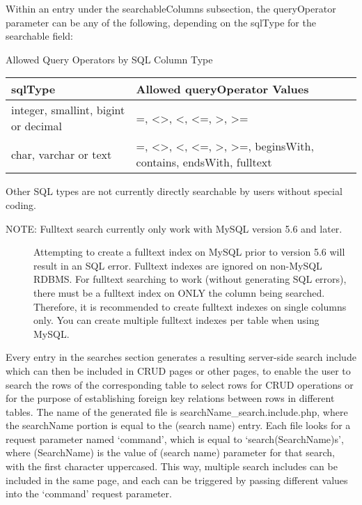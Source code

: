 \documentclass[letterpaper,10pt,english]{sphinxmanual}
\begin{document}
Within an entry under the searchableColumns subsection, the queryOperator parameter can be any of
the following, depending on the sqlType for the searchable field:

Allowed Query Operators by SQL Column Type

\begin{tabulary}{\linewidth}{|L|L|}
\hline
\textsf{\relax 
sqlType
} & \textsf{\relax 
Allowed queryOperator Values
}\\
\hline
integer, smallint, bigint or decimal
 & 
=, \textless{}\textgreater{}, \textless{}, \textless{}=, \textgreater{}, \textgreater{}=
\\
\hline
char, varchar or text
 & 
=, \textless{}\textgreater{}, \textless{}, \textless{}=, \textgreater{}, \textgreater{}=, beginsWith, contains, endsWith, fulltext
\\
\hline\end{tabulary}


Other SQL types are not currently directly searchable by users without special coding.
\begin{description}
\item[{NOTE: Fulltext search currently only work with MySQL version 5.6 and later.}] \leavevmode
Attempting to create a fulltext index on MySQL prior to version 5.6 will result in an SQL error.
Fulltext indexes are ignored on non-MySQL RDBMS.
For fulltext searching to work (without generating SQL errors), there must be a fulltext index
on ONLY the column being searched.  Therefore, it is recommended to create fulltext indexes on
single columns only.  You can create multiple fulltext indexes per table when using MySQL.

\end{description}

Every entry in the searches section generates a resulting server-side search include which can then
be included in CRUD pages or other pages, to enable the user to search the rows of the corresponding
table to select rows for CRUD operations or for the purpose of establishing foreign key relations
between rows in different tables.  The name of the generated file is searchName\_search.include.php,
where the searchName portion is equal to the (search name) entry.  Each file looks for a request
parameter named `command', which is equal to `search(SearchName)s', where (SearchName) is the value
of (search name) parameter for that search, with the first character uppercased.  This way, multiple
search includes can be included in the same page, and each can be triggered by passing different
values into the `command' request parameter.
\end{document}
